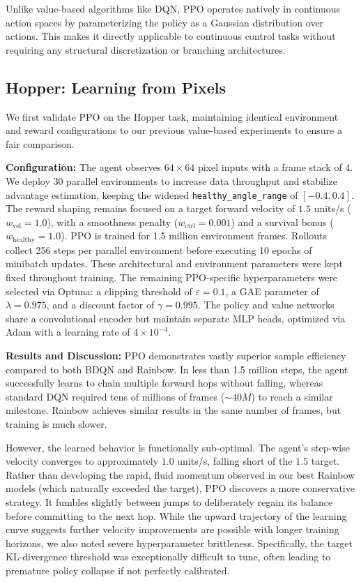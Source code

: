 Unlike value-based algorithms like DQN, PPO operates natively in continuous action spaces by parameterizing the policy as a Gaussian distribution over actions. This makes it directly applicable to continuous control tasks without requiring any structural discretization or branching architectures.

\subsection{Hopper: Learning from Pixels}
\label{sec:ppo_hopper_results}

We first validate PPO on the Hopper task, maintaining identical environment and reward configurations to our previous value-based experiments to ensure a fair comparison.

\textbf{Configuration:}
The agent observes $64 \times 64$ pixel inputs with a frame stack of 4. We deploy 30 parallel environments to increase data throughput and stabilize advantage estimation, keeping the widened \texttt{healthy\_angle\_range} of $[-0.4, 0.4]$. The reward shaping remains focused on a target forward velocity of $1.5$ units/s ($w_{\text{vel}} = 1.0$), with a smoothness penalty ($w_{\text{ctrl}} = 0.001$) and a survival bonus ($w_{\text{healthy}} = 1.0$). PPO is trained for 1.5 million environment frames. Rollouts collect 256 steps per parallel environment before executing 10 epochs of minibatch updates. These architectural and environment parameters were kept fixed throughout training.
The remaining PPO-specific hyperparameters were selected via Optuna: a clipping threshold of $\varepsilon = 0.1$, a GAE parameter of $\lambda = 0.975$, and a discount factor of $\gamma = 0.995$. The policy and value networks share a convolutional encoder but maintain separate MLP heads, optimized via Adam with a learning rate of $4 \times 10^{-4}$.

\textbf{Results and Discussion:}
PPO demonstrates vastly superior sample efficiency compared to both BDQN and Rainbow. In less than 1.5 million steps, the agent successfully learns to chain multiple forward hops without falling, whereas standard DQN required tens of millions of frames ($\sim 40M$) to reach a similar milestone. Rainbow achieves similar results in the same number of frames, but training is much slower.

However, the learned behavior is functionally sub-optimal. The agent's step-wise velocity converges to approximately $1.0$ units/s, falling short of the $1.5$ target. Rather than developing the rapid, fluid momentum observed in our best Rainbow models (which naturally exceeded the target), PPO discovers a more conservative strategy. It fumbles slightly between jumps to deliberately regain its balance before committing to the next hop. While the upward trajectory of the learning curve suggests further velocity improvements are possible with longer training horizons, we also noted severe hyperparameter brittleness. Specifically, the target KL-divergence threshold was exceptionally difficult to tune, often leading to premature policy collapse if not perfectly calibrated.

